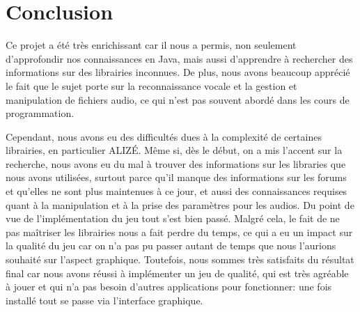 \section{Conclusion}
\label{sec:conclusion}

Ce projet a été très enrichissant car il nous a permis, non seulement d'approfondir nos connaissances en Java, mais aussi d'apprendre à rechercher des
informations sur des librairies inconnues. De plus, nous avons beaucoup apprécié le fait que le sujet porte sur la reconnaissance vocale et la gestion et
manipulation de fichiers audio, ce qui n'est pas souvent abordé dans les cours de programmation.

Cependant, nous avons eu des difficultés dues à la complexité de certaines librairies, en particulier ALIZÉ. Même si, dès le début, on a mis l'accent sur la
recherche, nous avons eu du mal à trouver des informations sur les libraries que nous avons utilisées, surtout parce qu'il manque des informations sur les forums et qu'elles ne sont plus maintenues à ce jour, et aussi des connaissances requises quant à la manipulation et à la prise des paramètres pour les audios.
Du point de vue de l'implémentation du jeu tout s'est bien passé. Malgré cela, le fait de ne pas maîtriser les librairies nous a fait perdre du temps, ce qui
a eu un impact sur la qualité du jeu car on n'a pas pu passer autant de temps que nous l'aurions souhaité sur l'aspect graphique. Toutefois, nous sommes
très satisfaits du résultat final car nous avons réussi à implémenter un jeu de qualité, qui est très agréable à jouer et qui n'a pas besoin d'autres
applications pour fonctionner: une fois installé tout se passe via l'interface graphique.

